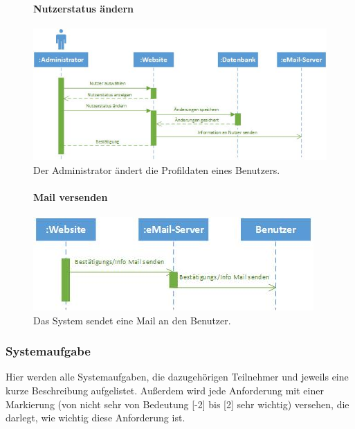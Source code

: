\documentclass[12pt,a4paper]{article}
\begin{document}
\begin{figure}[H]
	\centering
	\paragraph{Nutzerstatus ändern}
	\includegraphics[width=\textwidth]{Bilder/Sequenzdiagramme/NutzerstatusAendern1.jpg}
	\caption{Der Administrator ändert die Profildaten eines Benutzers.}
	\label{SzNutzerstatusAendern}
\end{figure}

\begin{figure}[H]
	\centering
	\paragraph{Mail versenden}
	\includegraphics[width=\textwidth]{Bilder/Sequenzdiagramme/MailVersenden1.jpg}
	\caption{Das System sendet eine Mail an den Benutzer.}
	\label{SzMailVersenden}
\end{figure}


\subsubsection{Systemaufgabe}
Hier werden alle Systemaufgaben, die dazugehörigen Teilnehmer und jeweils eine kurze Beschreibung aufgelistet. Außerdem wird jede Anforderung mit einer Markierung (von nicht sehr von Bedeutung [-2]  bis [2] sehr wichtig) versehen, die darlegt, wie wichtig diese Anforderung ist.
\end{document}
